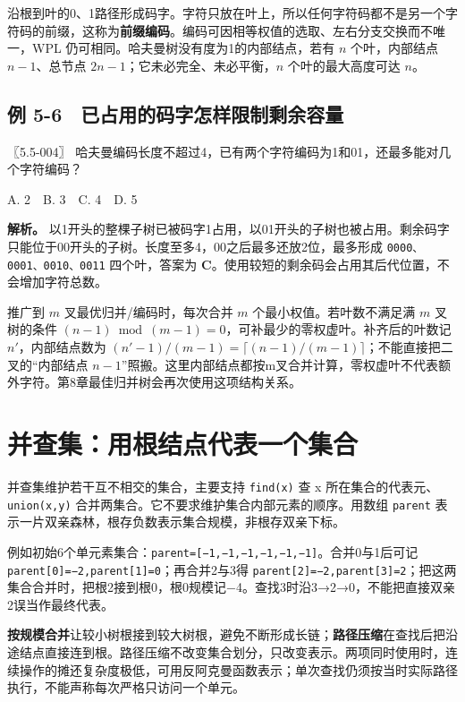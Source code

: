 沿根到叶的0、1路径形成码字。字符只放在叶上，所以任何字符码都不是另一个字符码的前缀，这称为\textbf{前缀编码}。编码可因相等权值的选取、左右分支交换而不唯一，WPL 仍可相同。哈夫曼树没有度为1的内部结点，若有 \(n\) 个叶，内部结点 \(n-1\)、总节点 \(2n-1\)；它未必完全、未必平衡，\(n\) 个叶的最大高度可达 \(n\)。

\subsection{例 5-6　已占用的码字怎样限制剩余容量}\label{ds-ex5-6}

\noindent{}〖5.5-004〗 哈夫曼编码长度不超过4，已有两个字符编码为1和01，还最多能对几个字符编码？

A. 2　B. 3　C. 4　D. 5


\textbf{解析。} 以1开头的整棵子树已被码字1占用，以01开头的子树也被占用。剩余码字只能位于00开头的子树。长度至多4，00之后最多还放2位，最多形成 \texttt{0000、0001、0010、0011} 四个叶，答案为 \textbf{C}。使用较短的剩余码会占用其后代位置，不会增加字符总数。

推广到 \(m\) 叉最优归并/编码时，每次合并 \(m\) 个最小权值。若叶数不满足满 \(m\) 叉树的条件 \((n-1)\bmod(m-1)=0\)，可补最少的零权虚叶。补齐后的叶数记 \(n'\)，内部结点数为 \((n'-1)/(m-1)=\lceil(n-1)/(m-1)\rceil\)；不能直接把二叉的``内部结点 \(n-1\)''照搬。这里内部结点都按m叉合并计算，零权虚叶不代表额外字符。第8章最佳归并树会再次使用这项结构关系。

\section{并查集：用根结点代表一个集合}\label{ds-05-10}

并查集维护若干互不相交的集合，主要支持 \texttt{find(x)} 查 x 所在集合的代表元、\texttt{union(x,}\allowbreak{}\texttt{y)} 合并两集合。它不要求维护集合内部元素的顺序。用数组 \texttt{parent} 表示一片双亲森林，根存负数表示集合规模，非根存双亲下标。

例如初始6个单元素集合：\texttt{parent={[}−1,}\allowbreak{}\texttt{−1,}\allowbreak{}\texttt{−1,}\allowbreak{}\texttt{−1,}\allowbreak{}\texttt{−1,}\allowbreak{}\texttt{−1{]}}。合并0与1后可记 \texttt{parent{[}0{]}=−2,}\allowbreak{}\texttt{parent{[}1{]}=0}；再合并2与3得 \texttt{parent{[}2{]}=−2,}\allowbreak{}\texttt{parent{[}3{]}=2}；把这两集合合并时，把根2接到根0，根0规模记−4。查找3时沿3→2→0，不能把直接双亲2误当作最终代表。

\textbf{按规模合并}让较小树根接到较大树根，避免不断形成长链；\textbf{路径压缩}在查找后把沿途结点直接连到根。路径压缩不改变集合划分，只改变表示。两项同时使用时，连续操作的摊还复杂度极低，可用反阿克曼函数表示；单次查找仍须按当时实际路径执行，不能声称每次严格只访问一个单元。

